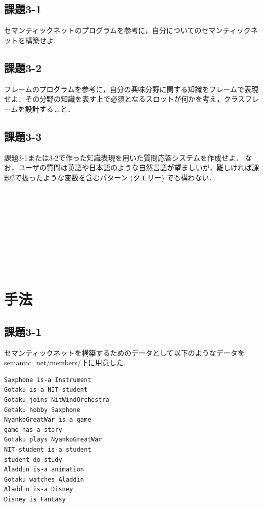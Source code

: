 ﻿\documentclass[uplatex,12pt]{jsarticle}
\begin{document}
\subsection{課題3-1}
\begin{screen}
セマンティックネットのプログラムを参考に，自分についてのセマンティックネットを構築せよ.
\end{screen}
\subsection{課題3-2}
\begin{screen}
フレームのプログラムを参考に，自分の興味分野に関する知識をフレームで表現せよ．その分野の知識を表す上で必須となるスロットが何かを考え，クラスフレームを設計すること．
\end{screen}
\subsection{課題3-3}
\begin{screen}
課題3-1または3-2で作った知識表現を用いた質問応答システムを作成せよ．
なお，ユーザの質問は英語や日本語のような自然言語が望ましいが，難しければ課題2で扱ったような変数を含むパターン (クエリー) でも構わない．
\end{screen}
\\\\\\\\\\\\\\\\
\section{手法}
\subsection{課題3-1}
セマンティックネットを構築するためのデータとして以下のようなデータをsemantic\_net/members/下に用意した.
\begin{lstlisting}[caption=semantic\_net/members/goto.txt, label=mid]
Saxphone is-a Instrument
Gotaku is-a NIT-student
Gotaku joins NitWindOrchestra
Gotaku hobby Saxphone
NyankoGreatWar is-a game
game has-a story
Gotaku plays NyankoGreatWar
NIT-student is-a student
student do study
Aladdin is-a animation
Gotaku watches Aladdin
Aladdin is-a Disney
Disney is Fantasy
\end{lstlisting}
\end{document}
